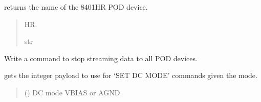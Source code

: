 \documentclass[letterpaper,10pt,english]{sphinxmanual}
\begin{document}
\begin{fulllineitems}
\begin{fulllineitems}
\end{fulllineitems}


\begin{fulllineitems}
\label{\detokenize{Setup.SetupOneDevice:Setup.SetupOneDevice.Setup_8401HR.Setup8401HR.GetDeviceName}}
\pysigstartsignatures
{}
\pysigstopsignatures
\sphinxAtStartPar
returns the name of the 8401\sphinxhyphen{}HR POD device.
\begin{quote}\begin{description}
\sphinxhyphen{}HR.

\sphinxAtStartPar
str

\end{description}\end{quote}

\end{fulllineitems}


\begin{fulllineitems}
\label{\detokenize{Setup.SetupOneDevice:Setup.SetupOneDevice.Setup_8401HR.Setup8401HR.StopStream}}
\pysigstartsignatures
{}
\pysigstopsignatures
\sphinxAtStartPar
Write a command to stop streaming data to all POD devices.

\end{fulllineitems}


\begin{fulllineitems}
\label{\detokenize{Setup.SetupOneDevice:Setup.SetupOneDevice.Setup_8401HR.Setup8401HR._CodeDCmode}}
\pysigstartsignatures
{}
\pysigstopsignatures
\sphinxAtStartPar
gets the integer payload to use for ‘SET DC MODE’ commands given the mode.
\begin{quote}\begin{description}
\sphinxAtStartPar
{} () \textendash{} DC mode VBIAS or AGND.


\end{description}
\end{quote}
\end{fulllineitems}
\end{fulllineitems}
\end{document}
